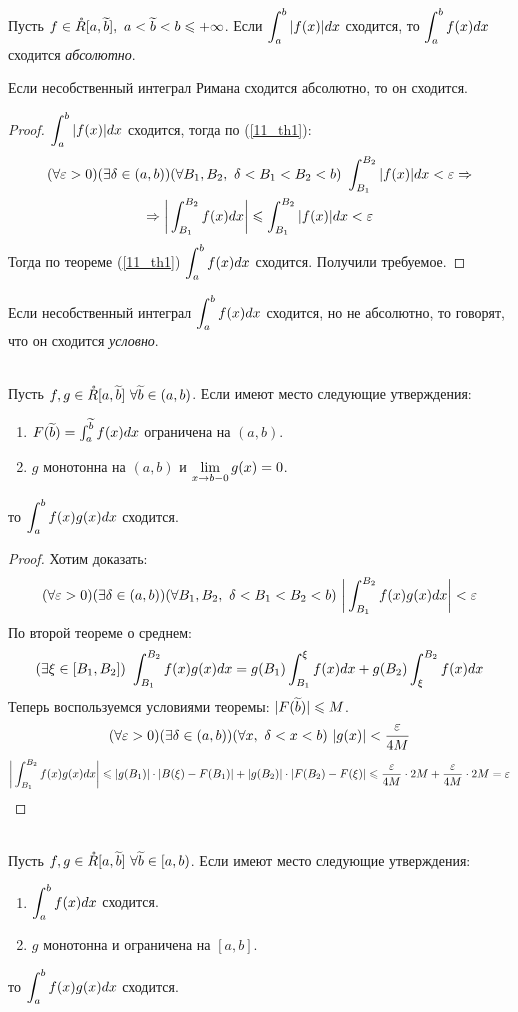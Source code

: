 \begin{definition}
	Пусть $f\in\mathring R[a,\widetilde b],\ a<\widetilde b<b\leqslant+\infty$. Если $\displaystyle\int_a^b|f(x)|dx$ сходится, то $\displaystyle\int_a^bf(x)dx$ сходится \textit{абсолютно}.
\end{definition}
\begin{theorem}
	Если несобственный интеграл Римана сходится абсолютно, то он сходится.
\end{theorem}
\begin{proof}
	$\displaystyle\int_a^b|f(x)|dx$ сходится, тогда по (\ref{11_th1}):
	\begin{multline*}
		(\fa\eps>0)(\ex\delta\in(a,b))(\fa B_1,B_2,\ \delta<B_1<B_2<b)\ \int_{B_1}^{B_2}|f(x)|dx<\eps\Ra\\
		\Ra\bigg|\int_{B_1}^{B_2}f(x)dx\bigg|\le\int_{B_1}^{B_2}|f(x)|dx<\eps
	\end{multline*}
	Тогда по теореме (\ref{11_th1}) $\displaystyle\int_a^bf(x)dx$ сходится.
	Получили требуемое.
\end{proof}
\begin{definition}
	Если несобственный интеграл $\displaystyle\int_a^bf(x)dx$ сходится, но не абсолютно, то говорят, что он сходится \textit{условно}.
\end{definition}
\begin{theorem}\label{11_th4}\\
	Пусть $f,g\in\mathring R[a,\widetilde b]\ \forall\widetilde b\in(a,b)$. Если имеют место следующие утверждения:
	\begin{enumerate}
		\item $F(\widetilde b)=\int_a^{\widetilde b}f(x)dx$ ограничена на $(a,b)$.
		\item $g$ монотонна на $(a,b)$ и $\lim_{x\ra b-0}g(x)=0$.
	\end{enumerate}
	то $\displaystyle\int_a^bf(x)g(x)dx$ сходится.
\end{theorem}
\begin{proof}
	Хотим доказать:
	\[(\fa\eps>0)(\ex\delta\in(a,b))(\fa B_1,B_2,\ \delta<B_1<B_2<b)\ \bigg|\int_{B_1}^{B_2}f(x)g(x)dx\bigg|<\eps\]
	По второй теореме о среднем:
	\[(\ex\xi\in[B_1,B_2])\ \int_{B_1}^{B_2}f(x)g(x)dx=g(B_1)\int_{B_1}^\xi f(x)dx+g(B_2)\int_\xi^{B_2}f(x)dx\]
	Теперь воспользуемся условиями теоремы: $|F(\widetilde b)|\leqslant M$.
	\[(\fa\eps>0)(\ex\delta\in(a,b))(\fa x,\ \delta<x<b)\ |g(x)|<\frac{\eps}{4M}\]
	\[\bigg|\int_{B_1}^{B_2}f(x)g(x)dx\bigg|\leqslant|g(B_1)|\cdot|B(\xi)-F(B_1)|+|g(B_2)|\cdot|F(B_2)-F(\xi)|\leqslant\frac{\varepsilon}{4M}\cdot2M+\frac{\varepsilon}{4M}\cdot2M=\varepsilon\]
\end{proof}
\begin{corollary}\\
	Пусть $f,g\in\mathring R[a,\widetilde b]\ \forall\widetilde b\in[a,b)$. Если имеют место следующие утверждения:
	\begin{enumerate}
		\item $\displaystyle\int_a^bf(x)dx$ сходится.
		\item $g$ монотонна и ограничена на $[a,b]$.
	\end{enumerate}
	то $\displaystyle\int_a^bf(x)g(x)dx$ сходится.
\end{corollary}
